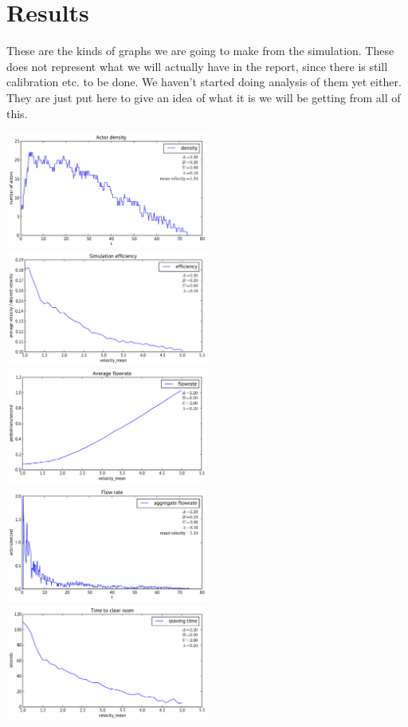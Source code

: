\section{Results}
\label{sec:results}

These are the kinds of graphs we are going to make from the simulation. These 
does not represent what we will actually have in the report, since there is 
still calibration etc. to be done. We haven't started doing analysis of them 
yet either. They are just put here to give an idea of what it is we will be 
getting from all of this.

\includegraphics[width=0.5\textwidth]{Figures/plots/square_room-density.pdf}
\includegraphics[width=0.5\textwidth]{Figures/plots/square_room-efficiency-aggr-velocity_mean.pdf}
\includegraphics[width=0.5\textwidth]{Figures/plots/square_room-flowrate-aggr-velocity_mean.pdf}
\includegraphics[width=0.5\textwidth]{Figures/plots/square_room-flowrate.pdf}
\includegraphics[width=0.5\textwidth]{Figures/plots/square_room-leaving_time-aggr-velocity_mean.pdf}
